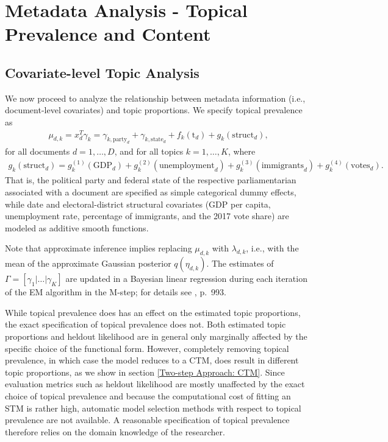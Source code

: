\section{Metadata Analysis - Topical Prevalence and Content}
\label{Metadata Analysis - Topical Prevalence and Content}

\subsection{Covariate-level Topic Analysis}
\label{Covariate-level Topic Analysis}

We now proceed to analyze the relationship between metadata information (i.e., document-level covariates) and topic proportions. We specify topical prevalence as 
\begin{align}
\mu_{d,k} = x_d^T \gamma_k= \gamma_{k,\text{party}_d} + \gamma_{k,\text{state}_d} + f_k(\text{t}_d) + g_k(\text{struct}_d), \label{prevalence}
\end{align} 
for all documents $d = 1,\dots,D$, and for all topics $k = 1,\dots,K$, where 
\begin{align*}
g_k(\text{struct}_d) = g_{k}^{(1)}(\text{GDP}_d)+g_{k}^{(2)}(\text{unemployment}_d)+g_{k}^{(3)}(\text{immigrants}_d)+g_{k}^{(4)}(\text{votes}_d). 
\end{align*} 
That is, the political party and federal state of the respective parliamentarian associated with a document are specified as simple categorical dummy effects, while date and electoral-district structural covariates (GDP per capita, unemployment rate, percentage of immigrants, and the 2017 vote share) are modeled as additive smooth functions.

Note that approximate inference implies replacing $\mu_{d,k}$ with $\lambda_{d,k}$, i.e., with the mean of the approximate Gaussian posterior $q(\eta_{d,k})$. The estimates of $\Gamma = [\gamma_1 | \dots | \gamma_K]$ are updated in a Bayesian linear regression during each iteration of the EM algorithm in the M-step; for details see \cite{roberts2013structural}, p.\ 993.

While topical prevalence does has an effect on the estimated topic proportions, the exact specification of topical prevalence does not. Both estimated topic proportions and heldout likelihood are in general only marginally affected by the specific choice of the functional form. However, completely removing topical prevalence, in which case the model reduces to a CTM, does result in different topic proportions, as we show in section \ref{Two-step Approach: CTM}. Since evaluation metrics such as heldout likelihood are mostly unaffected by the exact choice of topical prevalence and because the computational cost of fitting an STM is rather high, automatic model selection methods with respect to topical prevalence are not available. A reasonable specification of topical prevalence therefore relies on the domain knowledge of the researcher.

